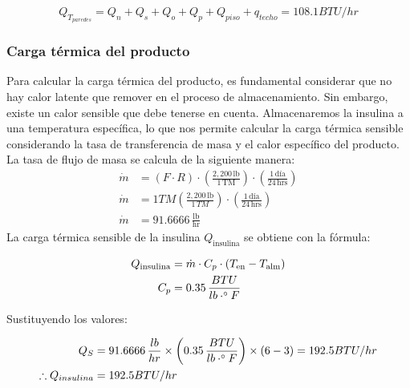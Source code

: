  \begin{equation}
Q_{T_{paredes}} = Q_n +Q_s + Q_o + Q_p + Q_{piso} +q_{techo} = 108.1  {BTU/hr}
 \end{equation}
 
 \subsubsection{Carga térmica del producto}
 Para calcular la carga térmica del producto, es fundamental considerar que no hay calor latente que remover en el proceso de almacenamiento. Sin embargo, existe un calor sensible que debe tenerse en cuenta. Almacenaremos la insulina a una temperatura específica, lo que nos permite calcular la carga térmica sensible considerando la tasa de transferencia de masa y el calor específico del producto.\\
 La tasa de flujo de masa se calcula de la siguiente manera: 
 \begin{equation}
 	\begin{aligned}
 		\dot{m} &= (F \cdot R) \cdot \left( \frac{2,200 \, \text{lb}}{1 \, \text{TM}} \right) \cdot \left( \frac{1 \, \text{día}}{24 \, \text{hrs}} \right) \\
 		\dot{m} &=1TM\left( \frac{2,200 \, \text{lb}}{1 \,TM  } \right) \cdot \left( \frac{1 \, \text{día}}{24 \, \text{hrs}} \right) \\
 		\dot{m} &= 91.6666 \, \frac{\text{lb}}{\text{hr}}
 	\end{aligned}
 \end{equation}
La carga térmica sensible de la insulina \( Q_{\text{insulina}} \) se obtiene con la fórmula:

\begin{equation}
	\begin{aligned}
		Q_{\text{insulina}} &= \dot{m} \cdot C_p \cdot (T_{\text{en}} - T_{\text{alm}}) \\
		C_p &= 0.35 \, \frac{ {BTU}}{ {lb} \cdot ^\circ F}
	\end{aligned}
\end{equation}

Sustituyendo los valores:

\begin{equation}
	\begin{aligned}
		Q_S &=  91.6666 \, \frac{ {lb}}{ {hr}}\times \left( 0.35 \, \frac{ {BTU}}{ {lb} \cdot ^\circ F} \right) \times ( 6 - 3)=192.5 {BTU/hr} \\
		\therefore Q_{insulina} &=192.5 {BTU/hr}
	\end{aligned}
\end{equation}

